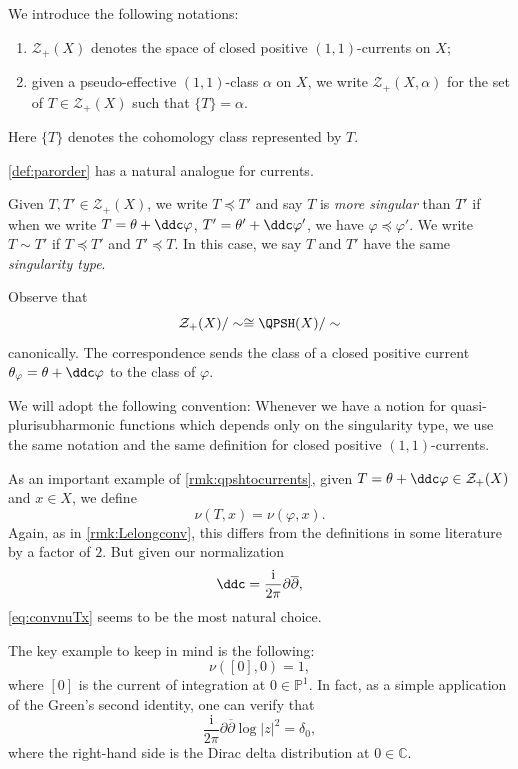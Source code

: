 \begin{definition}\label{def:spaceofcurrents}
    We introduce the following notations:
    \begin{enumerate}
        \item\label{itm:def:spaceofcurrents:1} $\mathcal{Z}_+(X)$  denotes the space of closed positive $(1,1)$-currents on $X$;
        \item\label{itm:def:spaceofcurrents:2} given a pseudo-effective $(1,1)$-class $\alpha$ on $X$, we write $\mathcal{Z}_+(X,\alpha)$  for the set of $T\in \mathcal{Z}_+(X)$ such that $\{T\}=\alpha$.
    \end{enumerate}
\end{definition}
Here $\{T\}$ denotes the cohomology class represented by $T$.

\cref{def:parorder} has a natural analogue for currents.

\begin{definition}\label{def:pshfunctions:L1594}
Given $T,T'\in \mathcal{Z}_+(X)$, we write $T\preceq T'$
and say $T$ is \emph{more singular} than $T'$ if when we write $T=\theta+\ddc\varphi$, $T'=\theta'+\ddc \varphi'$, we have $\varphi\preceq \varphi'$. We write $T\sim T'$
if $T\preceq T'$ and $T'\preceq T$. In this case, we say $T$ and $T'$ have the same \emph{singularity type}.
\end{definition}


\begin{remark}\label{rmk:qpshtocurrents}
Observe that
\[
\mathcal{Z}_+(X)/\sim\cong \QPSH(X)/\sim
\]
canonically. The correspondence sends the class of a closed positive current $\theta_{\varphi}=\theta+\ddc \varphi$ to the class of $\varphi$.

We will adopt the following convention: Whenever we have a notion for quasi-plurisubharmonic functions which depends only on the singularity type, we use the same notation and the same definition for closed positive $(1,1)$-currents.
\end{remark}

\begin{example}\label{ex:Lelongcurrent}
    As an important example of \cref{rmk:qpshtocurrents}, given $T=\theta+\ddc\varphi\in \mathcal{Z}_+(X)$ and $x\in X$, we define
\begin{equation}\label{eq:convnuTx}
\nu(T,x)=\nu(\varphi,x).
\end{equation}
Again, as in \cref{rmk:Lelongconv}, this differs from the definitions in some literature by a factor of $2$. But given our normalization
\[
\ddc=\frac{\mathrm{i}}{2\pi}\partial\overline{\partial},
\]
\eqref{eq:convnuTx} seems to be the most natural choice.

The key example to keep in mind is the following:
\[
\nu([0],0)=1,
\]
where $[0]$ is the current of integration at $0\in \mathbb{P}^1$. In fact, as a simple application of the Green's second identity, one can verify that
\[
\frac{\mathrm{i}}{2\pi}\partial\overline{\partial}\log |z|^2=\delta_0,
\]
where the right-hand side is the Dirac delta distribution at $0\in \mathbb{C}$.
\end{example}

